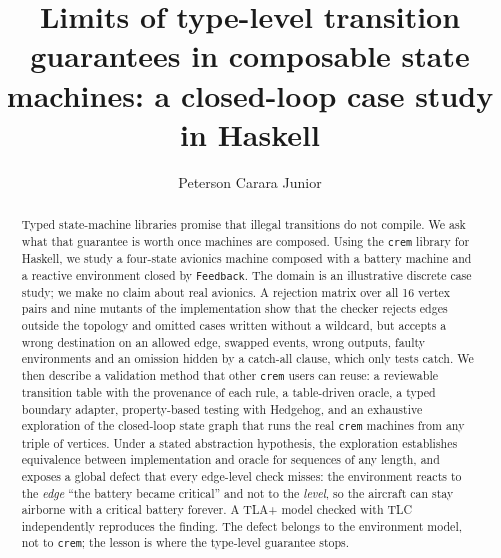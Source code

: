 \documentclass[review]{jfp-epi}
\newcommand{\crem}{\texttt{crem}}
\newcommand{\code}[1]{\texttt{#1}}
\begin{document}
\title{Limits of type-level transition guarantees in composable state machines: a closed-loop case study in Haskell}

\author{Peterson Carara Junior}

\begin{abstract}
Typed state-machine libraries promise that illegal transitions do not compile. We ask what that guarantee is worth once machines are composed. Using the \crem{} library for Haskell, we study a four-state avionics machine composed with a battery machine and a reactive environment closed by \code{Feedback}. The domain is an illustrative discrete case study; we make no claim about real avionics. A rejection matrix over all 16 vertex pairs and nine mutants of the implementation show that the checker rejects edges outside the topology and omitted cases written without a wildcard, but accepts a wrong destination on an allowed edge, swapped events, wrong outputs, faulty environments and an omission hidden by a catch-all clause, which only tests catch. We then describe a validation method that other \crem{} users can reuse: a reviewable transition table with the provenance of each rule, a table-driven oracle, a typed boundary adapter, property-based testing with Hedgehog, and an exhaustive exploration of the closed-loop state graph that runs the real \crem{} machines from any triple of vertices. Under a stated abstraction hypothesis, the exploration establishes equivalence between implementation and oracle for sequences of any length, and exposes a global defect that every edge-level check misses: the environment reacts to the \emph{edge} ``the battery became critical'' and not to the \emph{level}, so the aircraft can stay airborne with a critical battery forever. A TLA+ model checked with TLC independently reproduces the finding. The defect belongs to the environment model, not to \crem{}; the lesson is where the type-level guarantee stops.
\end{abstract}

\maketitle
\end{document}
